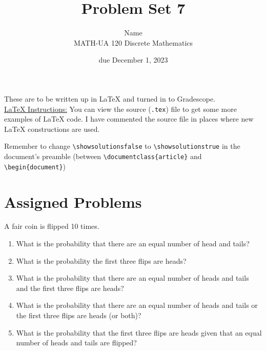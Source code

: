 \documentclass{article}
\title{Problem Set 7}
\author{%
    Name
\\  MATH-UA 120 Discrete Mathematics
}
\date{due December 1, 2023}
\newif\ifshowsolutions
\newcommand{\danger}{\marginpar[\hfill\dbend]{\dbend\hfill}}
\theoremstyle{definition}
\begin{document}
\maketitle



These are to be written up in \LaTeX{} and turned in to Gradescope.\\



\ifshowsolutions
    \SetupExSheets{solution/print=true}
\else
    \danger
 \underline{ \LaTeX{}  Instructions:}  You can view the source (\texttt{.tex}) file to get some more examples of \LaTeX{} code.  I have commented the source file in places where new \LaTeX{} constructions are used.
  
  Remember to change \verb|\showsolutionsfalse| to \verb|\showsolutionstrue|
    in the document's preamble 
    (between \verb|\documentclass{article}| and \verb|\begin{document}|)
\fi

\section*{Assigned Problems}



\begin{question}
        A fair coin is flipped 10 times.
    \begin{enumerate}
        \item What is the probability that there are an equal number of head and
            tails?
        \item What is the probability the first three flips are heads?
        \item What is the probability that there are an equal number of heads
            and tails and the first three flips are heads?
        \item What is the probability that there are an equal number of heads
            and tails or the first three flips are heads (or both)?
        \item What is the probability that the first three flips are heads given
            that an equal number of heads and tails are flipped?
    \end{enumerate}
\end{question}
\begin{solution}
\end{solution}
\end{document}

